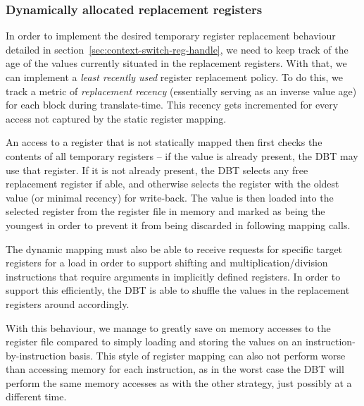 \subsubsection{Dynamically allocated replacement registers}
\label{sec:lazy-replace-details}
In order to implement the desired temporary register replacement behaviour detailed in section~\ref{sec:context-switch-reg-handle}, we need to keep track of the age of the values currently situated in the replacement registers.
With that, we can implement a \textit{least recently used} register replacement policy.
To do this, we track a metric of \textit{replacement recency} (essentially serving as an inverse value age) for each block during translate-time.
This recency gets incremented for every access not captured by the static register mapping.

An access to a register that is not statically mapped then first checks the contents of all temporary registers -- if the value is already present, the DBT may use that register.
If it is not already present, the DBT selects any free replacement register if able, and otherwise selects the register with the oldest value (or minimal recency) for write-back.
The value is then loaded into the selected register from the register file in memory and marked as being the youngest in order to prevent it from being discarded in following mapping calls.

The dynamic mapping must also be able to receive requests for specific target registers for a load in order to support shifting and multiplication/division instructions that require arguments in implicitly defined registers.
In order to support this efficiently, the DBT is able to shuffle the values in the replacement registers around accordingly.

With this behaviour, we manage to greatly save on memory accesses to the register file compared to simply loading and storing the values on an instruction-by-instruction basis.
This style of register mapping can also not perform worse than accessing memory for each instruction, as in the worst case the DBT will perform the same memory accesses as with the other strategy, just possibly at a different time.

